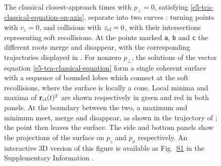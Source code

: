 \begin{figure}[t!h]
\centering
  \\
  \caption[
  Classical closest-approach times, both on-axis at $p_\perp=0$ and as a cusped surface in $\{(\vbp,t)\}$ space
  ]{
  The classical closest-approach times with $p_\perp=0$, satisfying \eqref{e5-tca-classical-equation-on-axis}, separate into two curves  \protect{}: turning points with $v_z=0$, and collisions with $z_{\mathrm{cl}}=0$, with their intersections representing soft recollisions. At the points marked \texttt{a}, \texttt{b} and \texttt{c} the different roots merge and disappear, with the corresponding trajectories displayed in .
  For nonzero $p_\perp$, the solutions of the vector equation \eqref{e5-tca-classical-equation} form a single coherent surface \protect{} with a sequence of bounded lobes which connect at the soft recollisions, where the surface is locally a cone.
  Local minima and maxima of $\vb{r}_{\mathrm{cl}}(t)^2$ are shown respectively in green and red in both panels. At the boundary between the two, a maximum and minimum meet, merge and disappear, as shown in the trajectory of ; the point then leaves the surface.
  The side  and bottom panels show the projections of the surface on $p_z$ and $p_x$ respectively. 
  An interactive 3D version of this figure is available as Fig.~\href{https://electrondynamicsincomplextimeandspace.github.io/\#figure-s1}{S1} in the Supplementary Information \cite{SupplementaryInformation}.
 }
  \label{f5-classical-tca-plots}
\end{figure}

